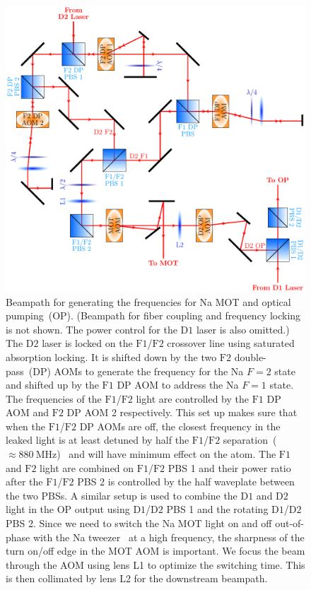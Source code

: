 \begin{figure}
  \centering
  \includegraphics[width=\textwidth]{figures/loading_na_res_beampath.pdf}
  \caption[Beampath for Na $\mathrm{D1}$ and $\mathrm{D2}$ light.]{
    Beampath for generating the frequencies for Na MOT and optical pumping~(OP).
    (Beampath for fiber coupling and frequency locking is not shown.
    The power control for the $\mathrm{D1}$ laser is also omitted.)
    The $\mathrm{D2}$ laser is locked on the $\mathrm{F1}$/$\mathrm{F2}$ crossover line using
    saturated absorption locking.
    It is shifted down by the two $\mathrm{F2}$ double-pass~(DP) AOMs to generate the frequency
    for the Na $F=2$ state and shifted up by the $\mathrm{F1}$ DP AOM
    to address the Na $F=1$ state.
    The frequencies of the $\mathrm{F1}$/$\mathrm{F2}$ light are controlled
    by the $\mathrm{F1}$ DP AOM and $\mathrm{F2}$ DP AOM 2 respectively.
    This set up makes sure that when the $\mathrm{F1}$/$\mathrm{F2}$ DP AOMs are off,
    the closest frequency in the leaked light is at least detuned
    by half the $\mathrm{F1}$/$\mathrm{F2}$
    separation~($\approx\!880~\mathrm{MHz}$)~\cite{steck_sodium_2019}
    and will have minimum effect on the atom.
    The $\mathrm{F1}$ and $\mathrm{F2}$ light are combined
    on $\mathrm{F1}$/$\mathrm{F2}$ PBS 1 and their power ratio after the
    $\mathrm{F1}$/$\mathrm{F2}$ PBS 2 is controlled by the half waveplate between the two PBSs.
    A similar setup is used to combine the $\mathrm{D1}$ and $\mathrm{D2}$ light
    in the OP output using $\mathrm{D1}$/$\mathrm{D2}$ PBS 1
    and the rotating $\mathrm{D1}$/$\mathrm{D2}$ PBS 2.
    Since we need to switch the Na MOT light on and off out-of-phase
    with the Na tweezer~\cite{hutzler_eliminating_2017} at a high frequency,
    the sharpness of the turn on/off edge in the MOT AOM is important.
    We focus the beam through the AOM using lens L1 to optimize the switching time.
    This is then collimated by lens L2 for the downstream beampath.
    \label{fig:loading:free-space:na-res-beampath}}
\end{figure}

